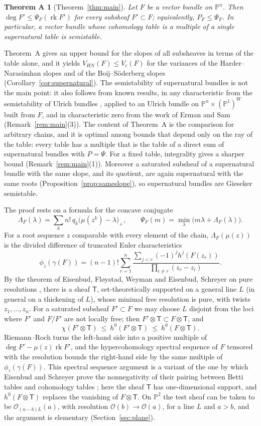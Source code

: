 \documentclass[11pt]{amsart}
\newtheorem*{theoremA}{Theorem A}
\theoremstyle{definition}
\theoremstyle{remark}
\newcommand{\PP}{\mathbb{P}}
\newcommand{\OO}{\mathcal{O}}
\newcommand{\Tt}{\mathsf{T}}
\DeclareMathOperator{\rk}{rk}
\begin{document}
\begin{theoremA}[Theorem~\ref{thm:main}]
Let $F$ be a vector bundle on $\PP^n$. Then $\deg F'\le\Psi_F(\rk F')$ for every subsheaf $F'\subset F$; equivalently, $P_F\le\Psi_F$. In particular, a vector bundle whose cohomology table is a multiple of a single supernatural table is semistable.
\end{theoremA}

Theorem~A gives an upper bound for the slopes of all subsheaves in terms of the table alone, and it yields $V_{HN}(F)\le V_c(F)$ for the variances of the Harder--Narasimhan slopes and of the Boij--Söderberg slopes (Corollary~\ref{cor:supernatural}). The semistability of supernatural bundles is not the main point: it also follows from known results, in any characteristic from the semistability of Ulrich bundles \cite[Thm.~2.9]{CH12}, applied to an Ulrich bundle on $\PP^n\times(\PP^1)^W$ built from $F$, and in characteristic zero from the work of Erman and Sam \cite{ErSa16} (Remark~\ref{rem:main}(3)). The content of Theorem~A is the comparison for arbitrary chains, and it is optimal among bounds that depend only on the ray of the table: every table has a multiple that is the table of a direct sum of supernatural bundles with $P=\Psi$. For a fixed table, integrality gives a sharper bound (Remark~\ref{rem:main}(1)). Moreover a saturated subsheaf of a supernatural bundle with the same slope, and its quotient, are again supernatural with the same roots (Proposition~\ref{prop:sameslope}), so supernatural bundles are Gieseker semistable.

The proof rests on a formula for the concave conjugate
\[
\Lambda_F(\lambda)=\sum_kn!\,q_k\big(\mu(z^k)-\lambda\big)_+ ,\qquad \Psi_F(m)=\min_\lambda\big(m\lambda+\Lambda_F(\lambda)\big).
\]
For a root sequence $z$ comparable with every element of the chain, $\Lambda_F(\mu(z))$ is the divided difference of truncated Euler characteristics
\[
\phi_z(\gamma(F))=(n-1)!\sum_{r=1}^n\frac{\sum_{j<r}(-1)^jh^j(F(z_r))}{\prod_{i\ne r}(z_r-z_i)} .
\]
By the theorem of Eisenbud, Fløystad, Weyman and Eisenbud, Schreyer on pure resolutions \cite{EFW11,ES09}, there is a sheaf $\Tt$, set-theoretically supported on a general line $L$ (in general on a thickening of $L$), whose minimal free resolution is pure, with twists $z_1,\dots,z_n$. For a saturated subsheaf $F'\subset F$ we may choose $L$ disjoint from the loci where $F'$ and $F/F'$ are not locally free; then $F'\otimes \Tt\subset F\otimes \Tt$, and
\[
\chi(F'\otimes \Tt)\ \le\ h^0(F'\otimes \Tt)\ \le\ h^0(F\otimes \Tt).
\]
Riemann--Roch turns the left-hand side into a positive multiple of $\deg F'-\mu(z)\rk F'$, and the hypercohomology spectral sequence of $F$ tensored with the resolution bounds the right-hand side by the same multiple of $\phi_z(\gamma(F))$. This spectral sequence argument is a variant of the one by which Eisenbud and Schreyer prove the nonnegativity of their pairing between Betti tables and cohomology tables \cite[\S3]{ES09}; here the sheaf $\Tt$ has one-dimensional support, and $h^0(F\otimes \Tt)$ replaces the vanishing of $F\otimes \Tt$. On $\PP^2$ the test sheaf can be taken to be $\OO_{(a-b)L}(a)$, with resolution $\OO(b)\to\OO(a)$, for a line $L$ and $a>b$, and the argument is elementary (Section~\ref{sec:plane}).
\end{document}

